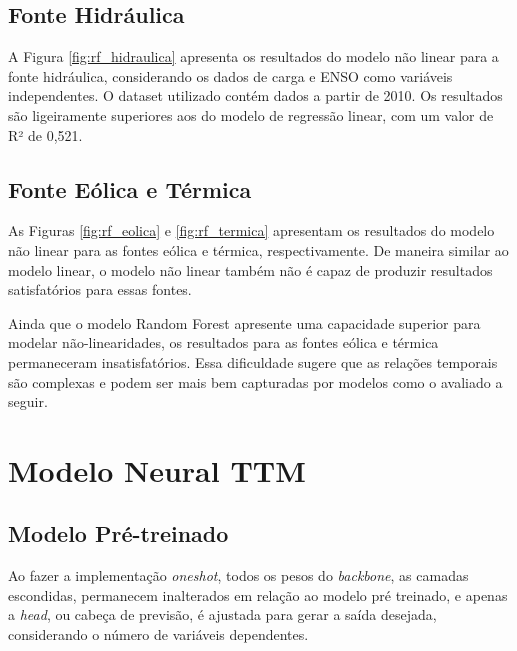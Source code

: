 \subsection{Fonte Hidráulica}
\begin{figure}[!ht]
  {}
  {}
\end{figure}
A Figura \ref{fig:rf_hidraulica} apresenta os resultados do modelo não linear para a fonte hidráulica, considerando os dados 
de carga e ENSO como variáveis independentes. O dataset utilizado contém dados a partir de 2010. Os resultados são
ligeiramente superiores aos do modelo de regressão linear, com um valor de R² de 0,521.

\subsection{Fonte Eólica e Térmica}
\begin{figure}[!ht]
  {}
  {}
\end{figure}
\begin{figure}[!ht]
  {}
  {}
\end{figure}

As Figuras \ref{fig:rf_eolica} e \ref{fig:rf_termica} apresentam os resultados do modelo não linear para as fontes eólica 
e térmica, respectivamente. De maneira similar ao modelo linear, o modelo não linear também não é capaz de produzir resultados
satisfatórios para essas fontes.

Ainda que o modelo Random Forest apresente uma capacidade superior para modelar não-linearidades, os resultados para as 
fontes eólica e térmica permaneceram insatisfatórios. Essa dificuldade sugere que as relações temporais são complexas e 
podem ser mais bem capturadas por modelos como o avaliado a seguir.

\section{Modelo Neural TTM}
\subsection{Modelo Pré-treinado}
Ao fazer a implementação \textit{oneshot}, todos os pesos do \textit{backbone}, as camadas escondidas, permanecem inalterados
em relação ao modelo pré treinado, e apenas a \textit{head}, ou cabeça de previsão, é ajustada para gerar a saída desejada,
considerando o número de variáveis dependentes.

